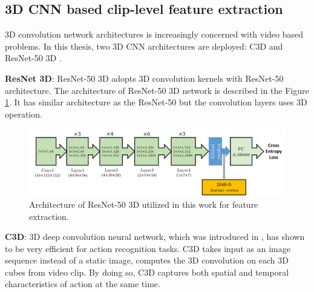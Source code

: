 
\subsection{3D CNN based clip-level feature extraction}
    3D convolution network architectures is increasingly concerned with video based problems. 
    In this thesis, two 3D CNN architectures are deployed: C3D \cite{duta2017spatio} and ResNet-50 3D \cite{hara2018can}. 

    \textbf{ResNet 3D}: ResNet-50 3D adopts 3D convolution kernels with ResNet-50 architecture. %
    The architecture of ResNet-50 3D network is described in the Figure \ref{fig:resnet50_3d}. It has similar architecture as the ResNet-50 but the convolution layers uses 3D operation.  
    \begin{figure}[htbp]
        \centering
        \includegraphics[width=1\linewidth]{figs/Resnet50_3D.png}
        \caption{Architecture of ResNet-50 3D utilized in this work for feature extraction.}
        \label{fig:resnet50_3d}
    \end{figure}

    \textbf{C3D}: 3D deep convolution neural network, which was introduced in \cite{tran2015learning}, has shown to be very efficient for action recognition tasks. C3D takes input as an image sequence instead of a static image, computes the 3D convolution on each 3D cubes from video clip. By doing so, C3D captures both spatial and temporal characteristics of action at the same time.

